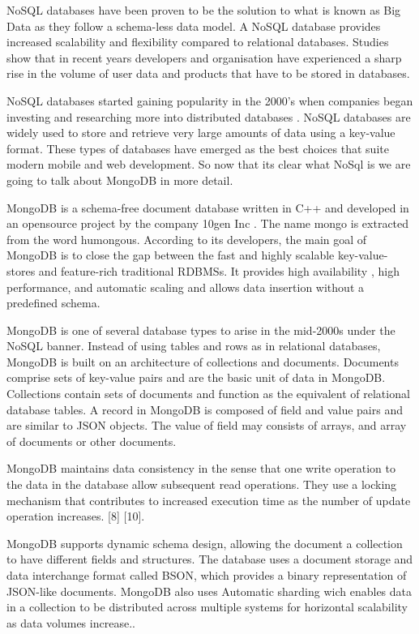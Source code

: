 NoSQL databases have been proven to be the solution to what is
known as Big Data as they follow a schema-less data model. A NoSQL database provides increased scalability and flexibility compared to relational databases. Studies show that in recent years developers and organisation have experienced a sharp rise in the volume of user data and products that have to be stored in databases. 

NoSQL databases started gaining popularity in the 2000’s when companies began investing and researching more into distributed databases \cite{no}.
NoSQL databases are widely used to store and retrieve very large amounts
of data using a key-value format. These types of databases have emerged
as the best choices that suite modern mobile and web development. So now that its clear what NoSql is we are going to talk about MongoDB in more detail.

MongoDB is a schema-free document database written in C++ and developed in an opensource project by the company 10gen Inc \cite{mongoname}. The name mongo is extracted from the word humongous. According to its developers, the main
goal of MongoDB is to close the gap between the fast and highly scalable key-value-stores and feature-rich traditional RDBMSs.
It provides high availability , high performance, and automatic scaling
and allows data insertion without a predefined schema. 

MongoDB is one of several database types to arise in the mid-2000s under the NoSQL banner. Instead of using tables and rows as in relational databases, MongoDB is built on an architecture of collections and documents. Documents comprise sets of key-value pairs and are the basic unit of data in MongoDB. Collections contain sets of documents and function as the equivalent of relational database tables. 
A record in MongoDB is composed of field and value pairs and are similar to
JSON objects. The value of field may consists of arrays, and array of documents
or other documents.

MongoDB maintains data consistency in the
sense that one write operation to the data in the database allow subsequent
read operations. They use a locking mechanism that contributes to increased
execution time as the number of update operation increases. [8] [10].

MongoDB supports dynamic schema design, allowing the document a collection to have different fields and structures. The database uses a document storage and data interchange format called BSON, which provides a binary representation of JSON-like documents. MongoDB also uses Automatic sharding wich enables data in a collection to be distributed across multiple systems for horizontal scalability as data volumes increase.\cite{MongoDB}.


